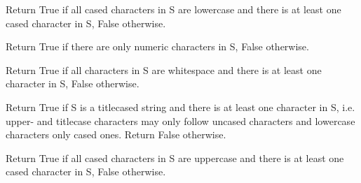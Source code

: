 \documentclass[letterpaper,10pt,english]{sphinxmanual}
\begin{document}
\begin{fulllineitems}
\begin{fulllineitems}
\label{api_reference:textblob_de.blob.Word.islower}
Return True if all cased characters in S are lowercase and there is
at least one cased character in S, False otherwise.

\end{fulllineitems}


\begin{fulllineitems}
\label{api_reference:textblob_de.blob.Word.isnumeric}
Return True if there are only numeric characters in S,
False otherwise.

\end{fulllineitems}


\begin{fulllineitems}
\label{api_reference:textblob_de.blob.Word.isspace}
Return True if all characters in S are whitespace
and there is at least one character in S, False otherwise.

\end{fulllineitems}


\begin{fulllineitems}
\label{api_reference:textblob_de.blob.Word.istitle}
Return True if S is a titlecased string and there is at least one
character in S, i.e. upper- and titlecase characters may only
follow uncased characters and lowercase characters only cased ones.
Return False otherwise.

\end{fulllineitems}


\begin{fulllineitems}
\label{api_reference:textblob_de.blob.Word.isupper}
Return True if all cased characters in S are uppercase and there is
at least one cased character in S, False otherwise.

\end{fulllineitems}


\end{fulllineitems}
\end{document}
